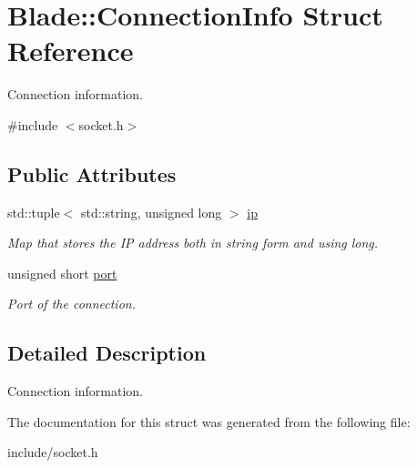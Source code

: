 \hypertarget{struct_blade_1_1_connection_info}{}\section{Blade\+:\+:Connection\+Info Struct Reference}
\label{struct_blade_1_1_connection_info}


Connection information.  




{\ttfamily \#include $<$socket.\+h$>$}

\subsection*{Public Attributes}
\begin{DoxyCompactItemize}
\item 
\mbox{\label{struct_blade_1_1_connection_info_ac7dcddc9adff5893212ccf257589beb7}} 
std\+::tuple$<$ std\+::string, unsigned long $>$ \hyperlink{struct_blade_1_1_connection_info_ac7dcddc9adff5893212ccf257589beb7}{ip}
\begin{DoxyCompactList}\small\item\em Map that stores the IP address both in string form and using long. \end{DoxyCompactList}\item 
\mbox{\label{struct_blade_1_1_connection_info_adc1c57992e467d1356080b166659a3fd}} 
unsigned short \hyperlink{struct_blade_1_1_connection_info_adc1c57992e467d1356080b166659a3fd}{port}
\begin{DoxyCompactList}\small\item\em Port of the connection. \end{DoxyCompactList}\end{DoxyCompactItemize}


\subsection{Detailed Description}
Connection information. 

The documentation for this struct was generated from the following file\+:\begin{DoxyCompactItemize}
\item 
include/socket.\+h\end{DoxyCompactItemize}
